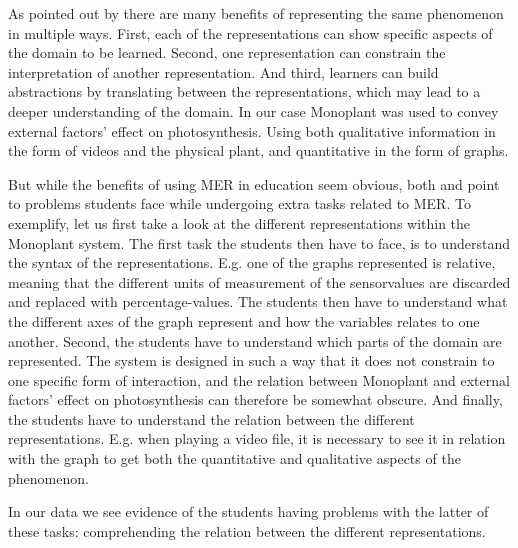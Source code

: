 As pointed out by \citet{van2006supporting} there are many benefits of representing the same phenomenon in multiple ways. First, each of the representations can show specific aspects of the domain to be learned. Second, one representation can constrain the interpretation of another representation. And third, learners can build abstractions by translating between the representations, which may lead to a deeper understanding of the domain. In our case Monoplant was used to convey external factors' effect on photosynthesis. Using both qualitative information in the form of videos and the physical plant, and quantitative in the form of graphs. 

But while the benefits of using MER in education seem obvious, both \citet{ainsworth1999functions} and \citet{van2006supporting} point to problems students face while undergoing extra tasks related to MER. To exemplify, let us first take a look at the different representations within the Monoplant system. The first task the students then have to face, is to understand the syntax of the representations. E.g. one of the graphs represented is relative, meaning that the different units of measurement of the sensorvalues are discarded and replaced with percentage-values. The students then have to understand what the different axes of the graph represent and how the variables relates to one another. Second, the students have to understand which parts of the domain are represented. The system is designed in such a way that it does not constrain to one specific form of interaction, and the relation between Monoplant and external factors' effect on photosynthesis can therefore be somewhat obscure. And finally, the students have to understand the relation between the different representations. E.g. when playing a video file, it is necessary to see it in relation with the graph to get both the quantitative and qualitative aspects of the phenomenon. 

In our data we see evidence of the students having problems with the latter of these tasks: comprehending the relation between the different representations. 




